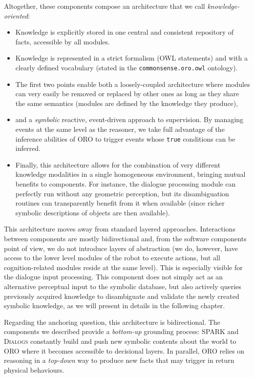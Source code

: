 Altogether, these components compose an architecture that we call
\emph{knowledge-oriented}:

\begin{itemize} \item{Knowledge is explicitly stored in one central and
consistent repository of facts, accessible by all modules.} \item{Knowledge is
represented in a strict formalism (OWL statements) and with a clearly defined
vocabulary (stated in the {\tt commonsense.oro.owl} ontology).} \item{The first
two points enable both a loosely-coupled architecture where modules can very
easily be removed or replaced by other ones as long as they share the same
semantics (modules are defined by the knowledge they produce),} \item{and a
\emph{symbolic} reactive, event-driven approach to supervision. By managing
events at the same level as the reasoner, we take full advantage of the
inference abilities of ORO to trigger events whose \texttt{true} conditions can
be inferred.} \item{Finally, this architecture allows for the combination of
very different knowledge modalities in a single homogeneous environment,
bringing mutual benefits to components. For instance, the dialogue processing
module can perfectly run without any geometric perception, but its
disambiguation routines can transparently benefit from it when available (since
richer symbolic descriptions of objects are then available).} \end{itemize}

This architecture moves away from standard layered approaches. Interactions
between components are mostly bidirectional and, from the software components
point of view, we do not introduce layers of abstraction (we do, however, have
access to the lower level modules of the robot to execute actions, but all
cognition-related modules reside at the same level). This is especially visible
for the dialogue input processing. This component does not simply act as an
alternative perceptual input to the symbolic database, but also actively
queries previously acquired knowledge to disambiguate and validate the newly
created symbolic knowledge, as we will present in details in the following
chapter.

Regarding the anchoring question, this architecture is bidirectional. The
components we described provide a \textit{bottom-up} grounding process: SPARK
and \textsc{Dialogs} constantly build and push new symbolic contents about the
world to ORO where it becomes accessible to decisional layers. In parallel, ORO
relies on reasoning in a \textit{top-down} way to produce new facts that may
trigger in return physical behaviours. 

